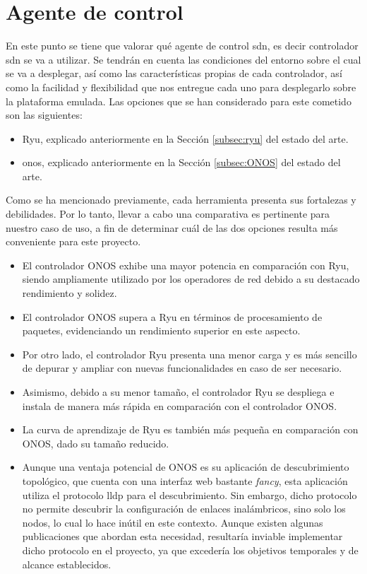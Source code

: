 \section{Agente de control }
\label{sec:ana_controller}

En este punto se tiene que valorar qué agente de control \gls{sdn}, es decir controlador \gls{sdn} se va a utilizar. Se tendrán en cuenta las condiciones del entorno sobre el cual se va a desplegar, así como las características propias de cada controlador, así como la facilidad y flexibilidad que nos entregue cada uno para desplegarlo sobre la plataforma emulada. Las opciones que se han considerado para este cometido son las siguientes:

\begin{itemize}
    \item Ryu, explicado anteriormente en la Sección \ref{subsec:ryu} del estado del arte.

    \item \gls{onos}, explicado anteriormente en la Sección \ref{subsec:ONOS} del estado del arte.
\end{itemize}

Como se ha mencionado previamente, cada herramienta presenta sus fortalezas y debilidades. Por lo tanto, llevar a cabo una comparativa es pertinente para nuestro caso de uso, a fin de determinar cuál de las dos opciones resulta más conveniente para este proyecto.

\begin{itemize}
    \item El controlador ONOS exhibe una mayor potencia en comparación con Ryu, siendo ampliamente utilizado por los operadores de red debido a su destacado rendimiento y solidez.
    \item El controlador ONOS supera a Ryu en términos de procesamiento de paquetes, evidenciando un rendimiento superior en este aspecto.
    \item Por otro lado, el controlador Ryu presenta una menor carga y es más sencillo de depurar y ampliar con nuevas funcionalidades en caso de ser necesario.
    \item Asimismo, debido a su menor tamaño, el controlador Ryu se despliega e instala de manera más rápida en comparación con el controlador ONOS.
    \item La curva de aprendizaje de Ryu es también más pequeña en comparación con ONOS, dado su tamaño reducido.
    \item Aunque una ventaja potencial de ONOS es su aplicación de descubrimiento topológico, que cuenta con una interfaz web bastante \textit{fancy}, esta aplicación utiliza el protocolo \gls{lldp} para el descubrimiento. Sin embargo, dicho protocolo no permite descubrir la configuración de enlaces inalámbricos, sino solo los nodos, lo cual lo hace inútil en este contexto. Aunque existen algunas publicaciones \cite{martinez2021ehddp} que abordan esta necesidad, resultaría inviable implementar dicho protocolo en el proyecto, ya que excedería los objetivos temporales y de alcance establecidos.
\end{itemize}


